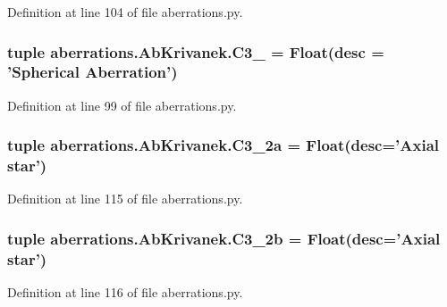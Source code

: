 Definition at line 104 of file aberrations.\-py.

\hypertarget{classaberrations_1_1_ab_krivanek_a8660810b2614beb56702878902b594f2}{
\subsubsection[{C3\-\_\-0}]{\setlength{\rightskip}{0pt plus 5cm}tuple aberrations.\-Ab\-Krivanek.\-C3\-\_ = Float(desc = 'Spherical Aberration')\hspace{0.3cm}{\ttfamily [static]}}}\label{classaberrations_1_1_ab_krivanek_a8660810b2614beb56702878902b594f2}


Definition at line 99 of file aberrations.\-py.

\hypertarget{classaberrations_1_1_ab_krivanek_a86e1ae8031fd414b99346ce5ccbe937c}{
\subsubsection[{C3\-\_\-2a}]{\setlength{\rightskip}{0pt plus 5cm}tuple aberrations.\-Ab\-Krivanek.\-C3\-\_\-2a = Float(desc='Axial star')\hspace{0.3cm}{\ttfamily [static]}}}\label{classaberrations_1_1_ab_krivanek_a86e1ae8031fd414b99346ce5ccbe937c}


Definition at line 115 of file aberrations.\-py.

\hypertarget{classaberrations_1_1_ab_krivanek_af86229f760e7b5f1f9fe191c93594d1c}{
\subsubsection[{C3\-\_\-2b}]{\setlength{\rightskip}{0pt plus 5cm}tuple aberrations.\-Ab\-Krivanek.\-C3\-\_\-2b = Float(desc='Axial star')\hspace{0.3cm}{\ttfamily [static]}}}\label{classaberrations_1_1_ab_krivanek_af86229f760e7b5f1f9fe191c93594d1c}


Definition at line 116 of file aberrations.\-py.

